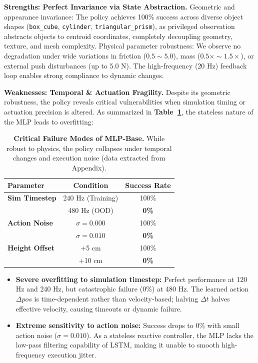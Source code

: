 \documentclass{article} %
\begin{document}
\textbf{Strengths: Perfect Invariance via State Abstraction.}
Geometric and appearance invariance: The policy achieves 100\% success across diverse object shapes (\texttt{box\_cube}, \texttt{cylinder}, \texttt{triangular\_prism}), as privileged observation abstracts objects to centroid coordinates, completely decoupling geometry, texture, and mesh complexity.
Physical parameter robustness: We observe no degradation under wide variations in friction ($0.5 \sim 5.0$), mass ($0.5\times \sim 1.5\times$), or external push disturbances (up to 5.0 N). The high-frequency (20 Hz) feedback loop enables strong compliance to dynamic changes.

\textbf{Weaknesses: Temporal \& Actuation Fragility.}
Despite its geometric robustness, the policy reveals critical vulnerabilities when simulation timing or actuation precision is altered. As summarized in \textbf{Table~\ref{tab:mlp_failure_modes}}, the stateless nature of the MLP leads to overfitting:

\begin{table}[h]
\centering
\small
\caption{{\bfseries Critical Failure Modes of MLP-Base.} While robust to physics, the policy collapses under temporal changes and execution noise (data extracted from Appendix).}
\label{tab:mlp_failure_modes}
\begin{tabular}{@{}lcc@{}}
\toprule
{\bfseries Parameter} & {\bfseries Condition} & {\bfseries Success Rate} \\ \midrule
{\bfseries Sim Timestep} & 240 Hz (Training) & 100\% \\
& 480 Hz (OOD) & {\bfseries 0\%} \\ \midrule
{\bfseries Action Noise} & $\sigma=0.000$ & 100\% \\
& $\sigma=0.010$ & {\bfseries 0\%} \\ \midrule
{\bfseries Height Offset} & +5 cm & 100\% \\
& +10 cm & {\bfseries 0\%} \\ \bottomrule
\end{tabular}
\end{table}

\begin{itemize}
    \item {\bfseries Severe overfitting to simulation timestep:} Perfect performance at 120 Hz and 240 Hz, but catastrophic failure (0\%) at 480 Hz. The learned action $\Delta pos$ is time-dependent rather than velocity-based; halving $\Delta t$ halves effective velocity, causing timeouts or dynamic failure.
    \item \textbf{Extreme sensitivity to action noise:} Success drops to 0\% with small action noise ($\sigma = 0.010$). As a stateless reactive controller, the MLP lacks the low-pass filtering capability of LSTM, making it unable to smooth high-frequency execution jitter.
\end{itemize}
\end{document}
